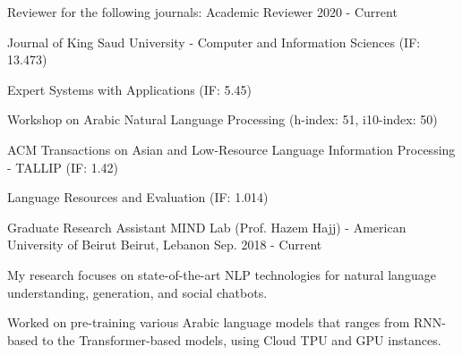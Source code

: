 \begin{cventries}
  \cventry
    {Reviewer for the following journals:} %
    {Academic Reviewer} %
    {} %
    {2020 - Current} %
    {
      \begin{cvitems} %
        \item {Journal of King Saud University - Computer and Information Sciences (IF: 13.473)}
        \item {Expert Systems with Applications (IF: 5.45)}
        \item Workshop on Arabic Natural Language Processing (h-index: 51, i10-index: 50)
        \item {ACM Transactions on Asian and Low-Resource Language Information Processing - TALLIP (IF: 1.42) }
        \item {Language Resources and Evaluation (IF: 1.014)}
      \end{cvitems}
    }


  \cventry
    {Graduate Research Assistant} %
    {MIND Lab (Prof. Hazem Hajj) - American University of Beirut} %
    {Beirut, Lebanon} %
    {Sep. 2018 - Current} %
    {
      \begin{cvitems} %
        \item {My research focuses on state-of-the-art NLP technologies for natural language understanding, generation, and social chatbots.}
        \item {Worked on pre-training various Arabic language models that ranges from RNN-based to the Transformer-based models, using Cloud TPU and GPU instances.}
      \end{cvitems}
    }


\end{cventries}
